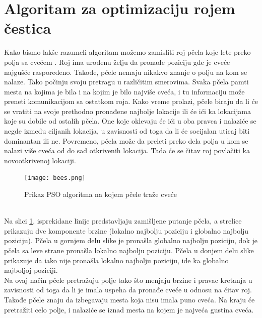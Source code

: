 \documentclass[a4paper]{article}
\begin{document}
\section{Algoritam za optimizaciju rojem čestica}
Kako bismo lakše razumeli algoritam možemo zamisliti roj pčela koje lete preko polja sa cvećem \cite{10.4018/IJRSDA.2018040101}. Roj ima urođenu želju da pronađe poziciju gde je cveće najgušće raspoređeno. Takođe, pčele nemaju nikakvo znanje o polju na kom se nalaze. Tako počinju svoju pretragu u različitim smerovima. Svaka pčela pamti mesta na kojima je bila i na kojim je bilo najviše cveća, i tu informaciju može preneti komunikacijom sa ostatkom roja. Kako vreme prolazi, pčele biraju da li će se vratiti na svoje prethodno pronađene najbolje lokacije ili će ići ka lokacijama koje su dobile od ostalih pčela. One koje oklevaju će ići u oba pravca i nalaziće se negde između ciljanih lokacija, u zavisnosti od toga da li će socijalan uticaj biti dominantan ili ne. Povremeno, pčela može da preleti preko dela polja u kom se nalazi više cveća od do sad otkrivenih lokacija. Tada će se čitav roj povlačiti ka novootkrivenoj lokaciji.
\begin{figure}[htp]
    \centering
    \texttt{[image: bees.png]}
    \caption{Prikaz PSO algoritma na kojem pčele traže cveće}
    \label{fig:bees}
\end{figure}
\\ \indent Na slici \ref{fig:bees}, isprekidane linije predstavljaju zamišljene putanje pčela, a strelice prikazuju dve komponente brzine (lokalno najbolju poziciju i globalno najbolju poziciju). Pčela u gornjem delu slike je pronašla globalno najbolju poziciju, dok je pčela sa leve strane pronašla lokalno najbolju poziciju. Pčela u donjem delu slike prikazuje da iako nije pronašla lokalno najbolju poziciju, ide ka globalno najboljoj poziciji. \\
\indent Na ovaj način pčele pretražuju polje tako što menjaju brzine i pravac kretanja u zavisnosti od toga da li je imala uspeha da pronađe cveće u odnosu na čitav roj. Takođe pčele znaju da izbegavaju mesta koja nisu imala puno cveća. Na kraju će pretražiti celo polje, i nalaziće se iznad mesta na kojem je najveća gustina cveća.
\end{document}
